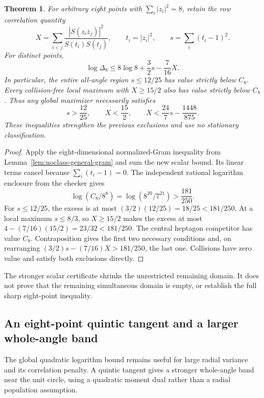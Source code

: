 \documentclass[11pt]{article}
\newtheorem{theorem}{Theorem}[section]
\theoremstyle{remark}
\numberwithin{equation}{section}
\begin{document}
\begin{theorem}\label{thm:noorigin-oct8-eight-sharper-regions}
For arbitrary eight points with $\sum_i|z_i|^2=8$, retain the
row correlation quantity
\[
 X=\sum_{i<j}\frac{|S(z_i\overline z_j)|^2}{S(t_i)S(t_j)},
 \qquad t_i=|z_i|^2,\qquad s=\sum_i(t_i-1)^2.
\]
For distinct points,
\[
                 \log\Delta_8\le8\log8+\frac32s-\frac7{16}X.
\]
In particular, the entire all-angle region $s\le12/25$ has
value strictly below $C_8$. Every collision-free local maximum
with $X\ge15/2$ also has value strictly below $C_8$.
Thus any global maximizer necessarily satisfies
\[
 s>\frac{12}{25},\qquad X<\frac{15}{2},\qquad
 X<\frac{24}{7}s-\frac{1448}{875}.
\]
These inequalities strengthen the previous exclusions and use no
stationary classification.
\end{theorem}
\begin{proof}
Apply the eight-dimensional normalized-Gram inequality
from Lemma~\ref{lem:noclass-general-gram} and sum the new scalar
bound. Its linear terms cancel because $\sum_i(t_i-1)=0$.
The independent rational logarithm enclosure from the checker gives
\[
 \log(C_8/8^8)=\log(8^{20}/7^{21})>\frac{181}{250}.
\]
For $s\le12/25$, the excess is at most
$(3/2)(12/25)=18/25<181/250$.
At a local maximum $s\le8/3$, so $X\ge15/2$ makes the excess
at most $4-(7/16)(15/2)=23/32<181/250$.
The central heptagon competitor has value $C_8$.
Contraposition gives the first two necessary conditions and,
on rearranging $(3/2)s-(7/16)X>181/250$, the last one.
Collisions have zero value and satisfy both exclusions directly.
\end{proof}

The stronger scalar certificate shrinks the unrestricted remaining
domain. It does not prove that the remaining simultaneous domain is
empty, or establish the full sharp eight-point inequality.

\subsection{An eight-point quintic tangent and a larger whole-angle band}
\label{sec:noorigin-oct8-eight-quintic}

The global quadratic logarithm bound remains useful for large radial
variance and its correlation penalty. A quintic tangent gives a
stronger whole-angle band near the unit circle, using a quadratic
moment dual rather than a radial population assumption.
\end{document}
